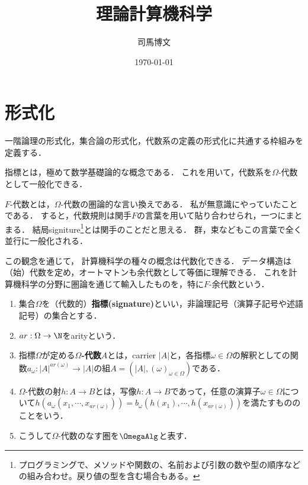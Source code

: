 \documentclass[uplatex,dvipdfmx]{jsreport}
\title{理論計算機科学}
\author{司馬博文}
\date{\today}
\begin{document}
\tableofcontents


\section{形式化}

\begin{screen}
    一階論理の形式化，集合論の形式化，代数系の定義の形式化に共通する枠組みを定義する．

    指標とは，極めて数学基礎論的な概念である．
    これを用いて，代数系を$\Omega$-代数として一般化できる．

    $F$-代数とは，$\Omega$-代数の圏論的な言い換えである．
    私が無意識にやっていたことである．
    すると，代数規則は関手$F$の言葉を用いて貼り合わせられ，一つにまとまる．
    結局signiture\footnote{プログラミングで、メソッドや関数の、名前および引数の数や型の順序などの組み合わせ。戻り値の型を含む場合もある。}とは関手のことだと思える．
    群，束などもこの言葉で全く並行に一般化される．

    この観念を通じて，
    計算機科学の種々の概念は代数化できる．
    データ構造は（始）代数を定め，オートマトンも余代数として等価に理解できる．
    これを計算機科学の分野に圏論を通じて輸入したものを，特に$F$-余代数という．
\end{screen}

\begin{definition}\mbox{}
    \begin{enumerate}
        \item 集合$\Omega$を（代数的）\textbf{指標(signature)}といい，非論理記号（演算子記号や述語記号）の集合とする．
        \item $ar:\Omega\to\N$をarityという．
        \item 指標$\Omega$が定める\textbf{$\Omega$-代数}$A$とは，carrier $|A|$と，各指標$\omega\in\Omega$の解釈としての関数$a_\omega:|A|^{ar(\omega)}\to|A|$の組$A=(|A|,(\omega)_{\omega\in\Omega})$である．
        \item $\Omega$-代数の射$h:A\to B$とは，写像$h:A\to B$であって，任意の演算子$\omega\in\Omega$について$h(a_\omega(x_1,\cdots,x_{ar(\omega)}))=b_\omega(h(x_1),\cdots,h(x_{ar(\omega)}))$を満たすもののことをいう．
        \item こうして$\Omega$-代数のなす圏を$\OmegaAlg$と表す．
    \end{enumerate}
\end{definition}
\end{document}

